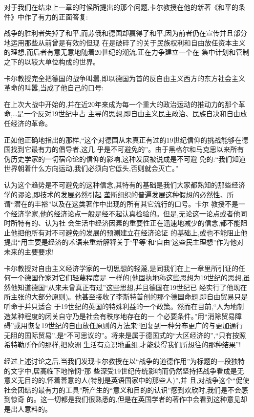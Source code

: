 ﻿\documentclass[12pt]{article}
\begin{document}
对于我们在结束上一章的时候所提出的那个问题,卡尔教授在他的新著《和平的条件》中作了有力的正面答复:

战争的胜利者失掉了和平,而苏俄和德国却赢得了和平,因为前者仍在宣传并且部分地运用那些从前曾是有效的但现
在是破碎了的关于民族权利和自由放任资本主义的理想,而后者有意无意地随着20世纪的潮流,正在力争建立一个在
集中计划和管制之下的以较大单位构成的世界。

卡尔教授完全把德国的战争叫嚣,即以德国为首的反自由主义西方的东方社会主义革命的叫嚣,当成了他自己的口号:

在上次大战中开始的,并在近20年来成为每一个重大的政治运动的推动力的那个革命,\ldots 是一个反对19世纪中占
主导的思想,即自由主义民主政治、民族自决和自由放任经济的革命。

正如他正确地指出的那样,``这个对德国从未真正有过的19世纪信仰的挑战能够在德国找到它最有力的倡导者,这几
乎是不可避免的''。由于黑格尔和马克思以来所有伪历史学家的一切宿命论的信仰的影响,这种发展被说成是不可避
免的:``我们知道世界朝着什么方向运动,我们必须向它低头,否则就会灭亡。''

认为这个趋势是不可避免的这种信念,其特有的基础是我们大家都熟知的那些经济学的谬论,即技术的发展必然引起
垄断组织的普遍发展这种假想的必然性、所谓``潜在的丰裕''以及在这类著作中出现的所有其它流行的口号。卡尔
教授不是一个经济学家,他的经济论点一般是经不起认真检验的。但是,无论这一论点或者他同时所特有的、认为社
会生活中经济因素的重要性正在迅速地减少的信念,都不能阻止他把他所有对不可避免的发展的预测建立在经济论证
的基础上,或也不能阻止他提出``用主要是经济的术语来重新解释关于‘平等’和‘自由’这些民主理想''作为他对
未来的主要要求!

卡尔教授对自由主义经济学家的一切思想的轻蔑,是同我们在上一章里所引证的任何一个德国作家对它们轻蔑程度是
一样的(他固执地称这些思想为19世纪的思想,虽然他知道德国``从来未曾真正有过''这些思想,并且德国在19世纪已
经实行了他现在所主张的大部分原则)。他甚至接收了李斯特首创的那个德国命题,即自由贸易只是听命于并只适合
于19世纪的英国的特殊利益的一个政策。然而在目前,``人为地制造某种程度的闭关自守乃是社会有秩序地存在的一
个必要条件。''用``消除贸易障碍''或用恢复19世纪的自由放任原则的方法来``回复到一种分布更广的与更加通行
无阻的国际贸易'',是``不可思议的''。将来是属于德国式的``大区经济的'',``只有按照希特勒所作的那样,把欧洲
生活有意识地重组,才能获得我们所想往的那种结果''!

经过上述讨论之后,当我们发现卡尔教授在以``战争的道德作用''为标题的一段独特的文字中,居高临下地怜悯``那
些深受19世纪传统影响而仍然坚持把战争看成是无意义无目的的,怀着善意的人(特别是英语国家中的那些人)'',并
且,对战争这个``促使社会团结的最有力的工具''所产生的``意义和目的的认识''感到欢欣时,我们是不会感到惊奇
的。这一切都是我们很熟悉的,但是在英国学者的著作中会看到这种意见却是出人意料的。
\end{document}
